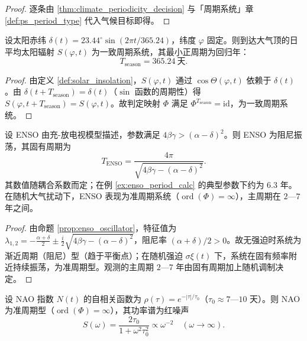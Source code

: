 \begin{proof}
逐条由 \cref{thm:climate_periodicity_decision} 与「周期系统」章 \cref{def:ps_period_type} 代入气候目标即得。
\end{proof}

\begin{lemma}[季节循环的周期判定]\label{lem:seasonal_periodic}
设太阳赤纬 $\delta(t) = 23.44^\circ \sin(2\pi t/365.24)$，纬度 $\varphi$ 固定。则到达大气顶的日平均太阳辐射 $S(\varphi,t)$ 为一致周期系统，其最小正周期为回归年：
\[
T_{\text{season}}=365.24\ \text{天}.
\]
\end{lemma}

\begin{proof}
由定义 \ref{def:solar_insolation}，$S(\varphi,t)$ 通过 $\cos\Theta(\varphi,t)$ 依赖于 $\delta(t)$。由 $\delta(t+T_{\text{season}})=\delta(t)$（$\sin$ 函数的周期性）得 $S(\varphi,t+T_{\text{season}})=S(\varphi,t)$。故判定映射 $\Phi$ 满足 $\Phi^{T_{\text{season}}}=\mathrm{id}$，为一致周期系统。
\end{proof}

\begin{lemma}\label{lem:enso_quasiperiodic}
设 ENSO 由充-放电视模型描述，参数满足 $4\beta\gamma > (\alpha-\delta)^2$。则 ENSO 为阻尼振荡，其固有周期为
\[
T_{\text{ENSO}} = \frac{4\pi}{\sqrt{4\beta\gamma - (\alpha-\delta)^2}}.
\]
其数值随耦合系数而定；在例 \ref{ex:enso_period_calc} 的典型参数下约为 $6.3$ 年。
在随机大气扰动下，ENSO 表现为准周期系统（$\operatorname{ord}(\Phi)=\infty$），主周期在 $2$—$7$ 年之间。
\end{lemma}

\begin{proof}
由命题 \ref{prop:enso_oscillator}，特征值为 $\lambda_{1,2}=-\frac{\alpha+\delta}{2}\pm \frac{i}{2}\sqrt{4\beta\gamma-(\alpha-\delta)^2}$，阻尼率 $(\alpha+\delta)/2>0$。故无强迫时系统为渐近周期（阻尼）型（趋于平衡点）；在随机强迫 $\sigma\xi(t)$ 下，系统在固有频率附近持续振荡，为准周期型。观测的主周期 $2$—$7$ 年由固有周期加上随机调制决定。
\end{proof}

\begin{lemma}\label{lem:nao_red_noise}
设 NAO 指数 $N(t)$ 的自相关函数为 $\rho(\tau)=e^{-|\tau|/\tau_0}$（$\tau_0\approx7$—$10$ 天）。则 NAO 为准周期型（$\operatorname{ord}(\Phi)=\infty$），其功率谱为红噪声
\[
S(\omega)=\frac{2\tau_0}{1+\omega^2\tau_0^2}\propto\omega^{-2}\quad(\omega\to\infty).
\]
\end{lemma}

